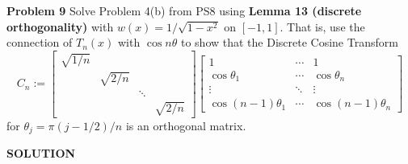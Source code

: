 \documentclass[12pt,a4paper]{article}
\begin{document}
\textbf{Problem 9} Solve Problem 4(b) from PS8 using \textbf{Lemma 13 (discrete orthogonality)} with $w(x) = 1/\sqrt{1-x^2}$ on $[-1,1]$. That is, use the connection of $T_n(x)$ with $\cos n \ensuremath{\theta}$ to show that the Discrete Cosine Transform
\[
C_n := \begin{bmatrix}
\sqrt{1/n} \\
 & \sqrt{2/n} \\
 && \ensuremath{\ddots} \\
 &&& \sqrt{2/n}
 \end{bmatrix}
\begin{bmatrix}
    1 & \ensuremath{\cdots} & 1\\
    \cos \ensuremath{\theta}_1 & \ensuremath{\cdots} & \cos \ensuremath{\theta}_n \\
    \ensuremath{\vdots} & \ensuremath{\ddots} & \ensuremath{\vdots} \\
    \cos (n-1)\ensuremath{\theta}_1 & \ensuremath{\cdots} & \cos (n-1)\ensuremath{\theta}_n
\end{bmatrix}
\]
for $\ensuremath{\theta}_j = \ensuremath{\pi}(j-1/2)/n$ is an orthogonal matrix.

\textbf{SOLUTION}
\end{document}
